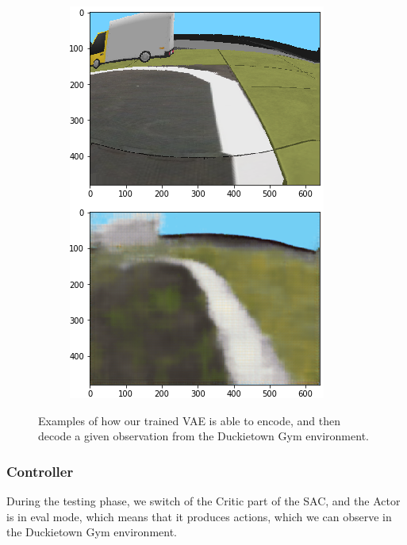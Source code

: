 \documentclass{article}
\begin{document}
\begin{figure}[!ht]
\begin{subfigure}[b]{.24\textwidth}
        \includegraphics[width=\textwidth]{vae4.png}
    \end{subfigure}
    \caption{Examples of how our trained VAE is able to encode, and then decode a given observation from the Duckietown Gym environment.}
    \label{fig:trained_vae}
\end{figure}

\subsubsection{Controller}
During the testing phase, we switch of the Critic part of the SAC, and the Actor is in eval mode, which means that it produces actions, which we can observe in the Duckietown Gym environment.
\end{document}
